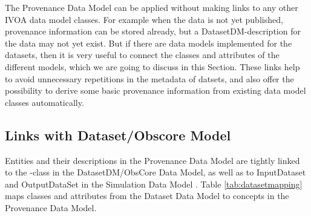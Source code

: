 
The Provenance Data Model can be applied without making links to any other 
IVOA data model classes. For example when the data is not yet published, provenance information
can be stored already, but a DatasetDM-description for the data may not yet exist.
But if there are data models implemented for the datasets, then it is 
very useful to connect the classes and attributes of the different models, 
which we are going to discuss in this Section. These links help to avoid 
unnecessary repetitions in the metadata of datsets, and also offer the possibility 
to derive some basic provenance information from existing data model classes automatically.


\subsection{Links with Dataset/Obscore Model}
Entities and their descriptions in the Provenance Data Model 
are tightly linked to the -class in the DatasetDM/ObsCore Data Model, as well as to 
InputDataset and OutputDataSet in the Simulation Data Model \citep[SimDM,][]{std:SimDM}.
Table \ref{tab:datasetmapping} maps classes and attributes from the Dataset Data Model 
to concepts in the Provenance Data Model.



